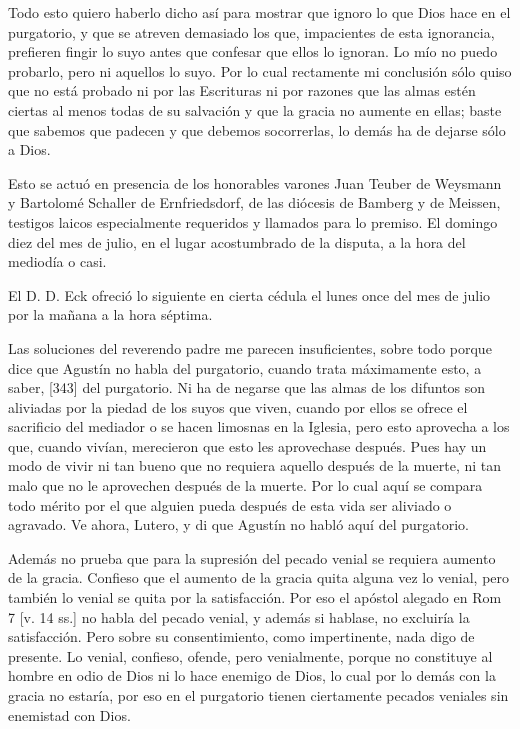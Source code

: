 Todo esto quiero haberlo dicho así para mostrar que ignoro lo que Dios hace en el purgatorio, y que se atreven demasiado los que, impacientes de esta ignorancia, prefieren fingir lo suyo antes que confesar que ellos lo ignoran. Lo mío no puedo probarlo, pero ni aquellos lo suyo. Por lo cual rectamente mi conclusión sólo quiso que no está probado ni por las Escrituras ni por razones que las almas estén ciertas al menos todas de su salvación y que la gracia no aumente en ellas; baste que sabemos que padecen y que debemos socorrerlas, lo demás ha de dejarse sólo a Dios.

Esto se actuó en presencia de los honorables varones Juan Teuber de Weysmann y Bartolomé Schaller de Ernfriedsdorf, de las diócesis de Bamberg y de Meissen, testigos laicos especialmente requeridos y llamados para lo premiso. El domingo diez del mes de julio, en el lugar acostumbrado de la disputa, a la hora del mediodía o casi.

El D. D. Eck ofreció lo siguiente en cierta cédula el lunes once del mes de julio por la mañana a la hora séptima.

Las soluciones del reverendo padre me parecen insuficientes, sobre todo porque dice que Agustín no habla del purgatorio, cuando trata máximamente esto, a saber, [343] del purgatorio. Ni ha de negarse que las almas de los difuntos son aliviadas por la piedad de los suyos que viven, cuando por ellos se ofrece el sacrificio del mediador o se hacen limosnas en la Iglesia, pero esto aprovecha a los que, cuando vivían, merecieron que esto les aprovechase después. Pues hay un modo de vivir ni tan bueno que no requiera aquello después de la muerte, ni tan malo que no le aprovechen después de la muerte. Por lo cual aquí se compara todo mérito por el que alguien pueda después de esta vida ser aliviado o agravado. Ve ahora, Lutero, y di que Agustín no habló aquí del purgatorio.

Además no prueba que para la supresión del pecado venial se requiera aumento de la gracia. Confieso que el aumento de la gracia quita alguna vez lo venial, pero también lo venial se quita por la satisfacción. Por eso el apóstol alegado en Rom 7 [v. 14 ss.] no habla del pecado venial, y además si hablase, no excluiría la satisfacción. Pero sobre su consentimiento, como impertinente, nada digo de presente. Lo venial, confieso, ofende, pero venialmente, porque no constituye al hombre en odio de Dios ni lo hace enemigo de Dios, lo cual por lo demás con la gracia no estaría, por eso en el purgatorio tienen ciertamente pecados veniales sin enemistad con Dios.


